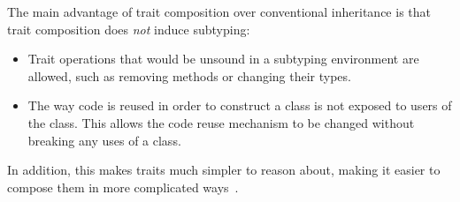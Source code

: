 The main advantage of trait composition over conventional inheritance is that trait composition does \emph{not} induce subtyping:
\begin{itemize}
	\item Trait operations that would be unsound in a subtyping environment are allowed, such as removing methods or changing their types.
	\item The way code is reused in order to construct a class is not exposed to users of the class. This allows the code reuse mechanism to be changed without breaking any uses of a class.
\end{itemize}
In addition, this makes traits much simpler to reason about, making it easier to compose them in more complicated ways~\cite{?}.